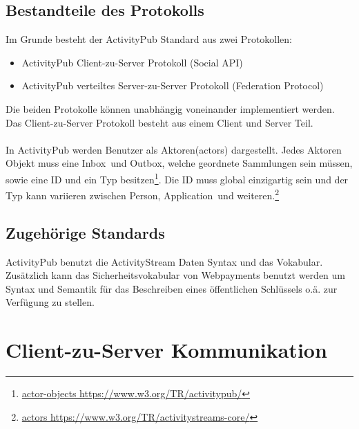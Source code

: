 \subsection{Bestandteile des Protokolls}
	Im Grunde besteht der ActivityPub Standard aus zwei Protokollen:
	\begin{itemize}
		\item ActivityPub Client-zu-Server Protokoll (Social API)
		\item ActivityPub verteiltes Server-zu-Server Protokoll (Federation Protocol)
	\end{itemize}
	Die beiden Protokolle können unabhängig voneinander implementiert werden. Das Client-zu-Server Protokoll besteht aus einem Client und Server Teil.
	\\\\ In ActivityPub werden Benutzer als \glqq Aktoren\grqq(actors) dargestellt. Jedes Aktoren Objekt muss eine \glqq Inbox\grqq~und \glqq Outbox\grqq, welche geordnete Sammlungen sein müssen, sowie eine ID und ein Typ besitzen\footnote{\href{https://www.w3.org/TR/activitypub/}{actor-objects https://www.w3.org/TR/activitypub/}}. Die ID muss global einzigartig sein und der Typ kann variieren zwischen \glqq Person\grqq, \glqq Application\grqq~und weiteren.\footnote{\href{https://www.w3.org/TR/activitystreams-core/}{actors https://www.w3.org/TR/activitystreams-core/}}
	
	

\subsection{Zugehörige Standards}
	ActivityPub benutzt die ActivityStream Daten Syntax und das Vokabular. Zusätzlich kann das Sicherheitsvokabular von Webpayments benutzt werden um Syntax und Semantik für das Beschreiben eines öffentlichen Schlüssels o.ä. zur Verfügung zu stellen.

\section{Client-zu-Server Kommunikation}
	

